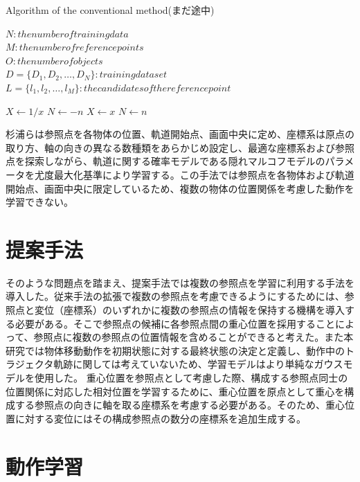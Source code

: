 	\begin{algorithm}
		\caption{Algorithm of the conventional method(まだ途中)}
		\begin{algorithmic}
			\REQUIRE
				$N : the number of training data$ \\
				$M : the number of reference points$ \\
				$O : the number of objects$ \\
				$D = \{D_{1} , D_{2} , \ldots , D_{N}\} : training dataset$ \\
				$L = \{l_{1} , l_{2} , \ldots , l_{M}\} : the candidates of the reference point$ \\
		\end{algorithmic}
		\begin{algorithmic}[1]
			\IF{$n < 0$}
			\STATE $X \leftarrow 1 / x$
			\STATE $N \leftarrow -n$
			\ELSE
			\STATE $X \leftarrow x$
			\STATE $N \leftarrow n$
			\ENDIF
		\end{algorithmic}
	\end{algorithm}


杉浦らは参照点を各物体の位置、軌道開始点、画面中央に定め、座標系は原点の取り方、軸の向きの異なる数種類をあらかじめ設定し、最適な座標系および参照点を探索しながら、軌道に関する確率モデルである隠れマルコフモデルのパラメータを尤度最大化基準により学習する。この手法では参照点を各物体および軌道開始点、画面中央に限定しているため、複数の物体の位置関係を考慮した動作を学習できない。

\section{提案手法}

そのような問題点を踏まえ、提案手法では複数の参照点を学習に利用する手法を導入した。従来手法の拡張で複数の参照点を考慮できるようにするためには、参照点と変位（座標系）のいずれかに複数の参照点の情報を保持する機構を導入する必要がある。そこで参照点の候補に各参照点間の重心位置を採用することによって、参照点に複数の参照点の位置情報を含めることができると考えた。また本研究では物体移動動作を初期状態に対する最終状態の決定と定義し、動作中のトラジェクタ軌跡に関しては考えていないため、学習モデルはより単純なガウスモデルを使用した。
重心位置を参照点として考慮した際、構成する参照点同士の位置関係に対応した相対位置を学習するために、重心位置を原点として重心を構成する参照点の向きに軸を取る座標系を考慮する必要がある。そのため、重心位置に対する変位にはその構成参照点の数分の座標系を追加生成する。

\section{動作学習}

